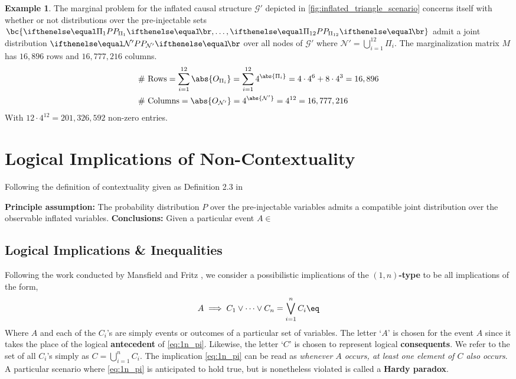 \documentclass[aps, 10pt, english, twoside, pra, nofootinbib, longbibliography]{revtex4-1}
\theoremstyle{plain}
\theoremstyle{definition}
\newtheorem{example}[theorem]{Example}
\theoremstyle{remark}
\newcommand{\graph}{\mathcal{G}}
\newcommand{\nodes}{\mathcal{N}}
\newcommand{\term}[1]{\textcolor{Mahogany}{\textbf{#1}}}
\begin{document}
    \begin{example}
        The marginal problem for the inflated causal structure $\graph'$ depicted in \cref{fig:inflated_triangle_scenario} concerns itself with whether or not distributions over the pre-injectable sets $\bc{\prob[\Pi_1], \ldots, \prob[\Pi_{12}]}$ admit a joint distribution $\prob[\mathcal{\nodes'}]$ over all nodes of $\graph'$ where $\nodes' = \bigcup_{i=1}^{12}\Pi_i$. The marginalization matrix $M$ has $16,896$ rows and $16,777,216$ columns.
        \begin{align*}
            &\text{\# Rows} = \sum_{i=1}^{12} \abs{O_{\Pi_i}} = \sum_{i=1}^{12} 4^{\abs{\Pi_i}} = 4 \cdot 4^6 + 8 \cdot 4^3 = 16,896 \\
            &\text{\# Columns} = \abs{O_{\nodes'}} = 4^{\abs{\nodes'}} = 4^{12} = 16,777,216
        \end{align*}
        With $12 \cdot 4^{12} = 201,326,592$ non-zero entries.
    \end{example}

    \section{Logical Implications of Non-Contextuality}
    Following the definition of contextuality given as Definition 2.3 in \cite{Fritz_2011}

    \textbf{Principle assumption:} The probability distribution $P$ over the pre-injectable variables admits a compatible joint distribution over the observable inflated variables.
    \textbf{Conclusions:} Given a particular event $A \in $
    \subsection{Logical Implications \& Inequalities}
    Following the work conducted by Mansfield and Fritz \cite{Mansfield_2012}, we consider a possibilistic implications of the \term{$(1,n)$-type} to be all implications of the form,
    \[ A \implies C_1 \lor \cdots \lor C_n = \bigvee_{i=1}^{n} C_i \eq \label{eq:1n_pi}\]
    Where $A$ and each of the $C_i$'s are simply events or outcomes of a particular set of variables. The letter `$A$' is chosen for the event $A$ since it takes the place of the logical \term{antecedent} of \cref{eq:1n_pi}. Likewise, the letter `$C$' is chosen to represent logical \term{consequents}. We refer to the set of all $C_i$'s simply as $C = \bigcup_{i=1}^n C_i$. The implication \cref{eq:1n_pi} can be read as \textit{whenever $A$ occurs, at least one element of $C$ also occurs}. A particular scenario where \cref{eq:1n_pi} is anticipated to hold true, but is nonetheless violated is called a \term{Hardy paradox}.
\end{document}
